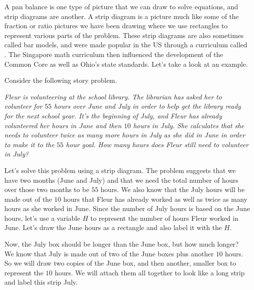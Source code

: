 \documentclass{ximera}
\begin{document}
A pan balance is one type of picture that we can draw to solve equations, and strip diagrams are another. A strip diagram is a picture much like some of the fraction or ratio pictures we have been drawing where we use rectangles to represent various parts of the problem. These strip diagrams are also sometimes called bar models, and were made popular in the US through a curriculum called . The Singapore math curriculum then influenced the development of the Common Core as well as Ohio's state standards. Let's take a look at an example.

\begin{example}
Consider the following story problem.

\emph{Fleur is volunteering at the school library. The librarian has asked her to volunteer for $55$ hours over June and July in order to help get the library ready for the next school year. It's the beginning of July, and Fleur has already volunteered her hours in June and then $10$ hours in July. She calculates that she needs to volunteer twice as many more hours in July as she did in June in order to make it to the $55$ hour goal. How many hours does Fleur still need to volunteer in July?}

Let's solve this problem using a strip diagram. The problem suggests that we have two months (June and July) and that we need the total number of hours over those two months to be $55$ hours. We also know that the July hours will be made out of the $10$ hours that Fleur has already worked as well as twice as many hours as she worked in June. Since the number of July hours is based on the June hours, let's use a variable $H$ to represent the number of hours Fleur worked in June. Let's draw the June hours as a rectangle and also label it with the $H$.
\begin{image}\end{image}

Now, the July box should be longer than the June box, but how much longer? We know that July is made out of two of the June boxes plus another $10$ hours. So we will draw two copies of the June box, and then another, smaller box to represent the $10$ hours. We will attach them all together to look like a long strip and label this strip July.


\end{example}
\end{document}
